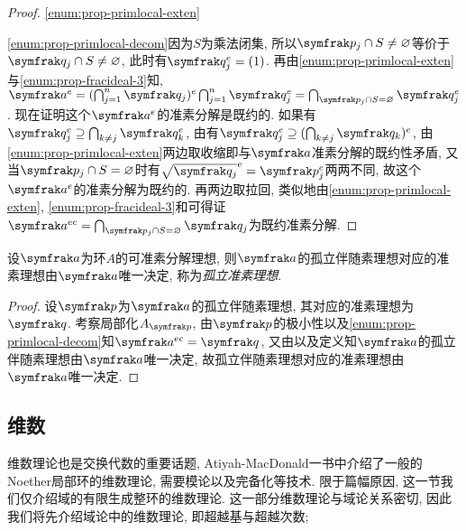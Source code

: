 \begin{proof}
  \ref{enum:prop-primlocal-exten}%

  \ref{enum:prop-primlocal-decom}因为$S$为乘法闭集, 所以$\ideal{p}_j\cap S\neq\varnothing$等价于$\ideal{q}_j\cap S\neq\varnothing$, 此时有$\ideal{q}_j^e=(1)$. 再由\ref{enum:prop-primlocal-exten}与\ref{enum:prop-fracideal-3}知, $\ideal{a}^e=(\bigcap_{j=1}^n\ideal{q}_j)^e\bigcap_{j=1}^n\ideal{q}_j^e=\bigcap_{\ideal{p}_j\cap S=\varnothing}\ideal{q}_j^e$. 现在证明这个$\ideal{a}^e$的准素分解是既约的. 如果有$\ideal{q}_j^e\supseteq\bigcap_{k\neq j}\ideal{q}_k^e$, 由有$\ideal{q}_j^e\supseteq(\bigcap_{k\neq j}\ideal{q}_k)^e$, 由\ref{enum:prop-primlocal-exten}两边取收缩即与$\ideal{a}$准素分解的既约性矛盾, 又当$\ideal{p}_j\cap S=\varnothing$时有$\sqrt{\ideal{q}_j}^e=\ideal{p}_j^e$两两不同, 故这个$\ideal{a}^e$的准素分解为既约的. 再两边取拉回, 类似地由\ref{enum:prop-primlocal-exten}, \ref{enum:prop-fracideal-3}和可得证$\ideal{a}^{ec}=\bigcap_{\ideal{p}_j\cap S=\varnothing}\ideal{q}_j$为既约准素分解.
\end{proof}

\begin{theorem}
  设$\ideal{a}$为环$A$的可准素分解理想, 则$\ideal{a}$的孤立伴随素理想对应的准素理想由$\ideal{a}$唯一决定, 称为\emph{孤立准素理想}.
\end{theorem}

\begin{proof}
  设$\ideal{p}$为$\ideal{a}$的孤立伴随素理想, 其对应的准素理想为$\ideal{q}$. 考察局部化$A_{\ideal{p}}$, 由$\ideal{p}$的极小性以及\ref{enum:prop-primlocal-decom}知$\ideal{a}^{ec}=\ideal{q}$, 又由以及定义知$\ideal{a}$的孤立伴随素理想由$\ideal{a}$唯一决定, 故孤立伴随素理想对应的准素理想由$\ideal{a}$唯一决定.
\end{proof}

\subsection{维数}\label{sec:algebra-dimension}

维数理论也是交换代数的重要话题, Atiyah-MacDonald一书中介绍了一般的Noether局部环的维数理论, 需要模论以及完备化等技术. 限于篇幅原因, 这一节我们仅介绍域的有限生成整环的维数理论. 这一部分维数理论与域论关系密切, 因此我们将先介绍域论中的维数理论, 即超越基与超越次数;%

